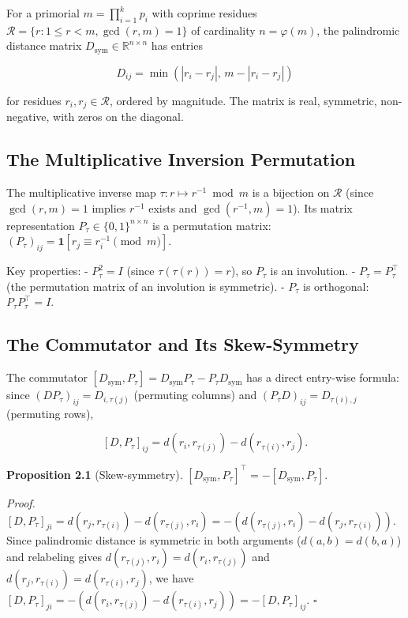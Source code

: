 \documentclass[11pt,letterpaper]{article}
\theoremstyle{definition}
\theoremstyle{remark}
\begin{document}
For a primorial $m = \prod_{i=1}^k p_i$ with coprime residues $\mathcal{R} = \{r : 1 \leq r < m, \gcd(r,m) = 1\}$ of cardinality $n = \varphi(m)$, the palindromic distance matrix $D_{\text{sym}} \in \mathbb{R}^{n \times n}$ has entries

\[D_{ij} = \min(|r_i - r_j|, \, m - |r_i - r_j|)\]

for residues $r_i, r_j \in \mathcal{R}$, ordered by magnitude. The matrix is real, symmetric, non-negative, with zeros on the diagonal.

\subsection{The Multiplicative Inversion Permutation}\label{the-multiplicative-inversion-permutation}

The multiplicative inverse map $\tau : r \mapsto r^{-1} \bmod m$ is a bijection on $\mathcal{R}$ (since $\gcd(r,m) = 1$ implies $r^{-1}$ exists and $\gcd(r^{-1},m) = 1$). Its matrix representation $P_\tau \in \{0,1\}^{n \times n}$ is a permutation matrix: $(P_\tau)_{ij} = \mathbf{1}[r_j \equiv r_i^{-1} \pmod{m}]$.

Key properties: - $P_\tau^2 = I$ (since $\tau(\tau(r)) = r$), so $P_\tau$ is an involution. - $P_\tau = P_\tau^\top$ (the permutation matrix of an involution is symmetric). - $P_\tau$ is orthogonal: $P_\tau P_\tau^\top = I$.

\subsection{The Commutator and Its Skew-Symmetry}\label{the-commutator-and-its-skew-symmetry}

The commutator $[D_{\text{sym}}, P_\tau] = D_{\text{sym}} P_\tau - P_\tau D_{\text{sym}}$ has a direct entry-wise formula: since $(DP_\tau)_{ij} = D_{i,\tau(j)}$ (permuting columns) and $(P_\tau D)_{ij} = D_{\tau(i),j}$ (permuting rows),

\[[D, P_\tau]_{ij} = d(r_i, r_{\tau(j)}) - d(r_{\tau(i)}, r_j).\]

\textbf{Proposition 2.1} (Skew-symmetry). $[D_{\text{sym}}, P_\tau]^\top = -[D_{\text{sym}}, P_\tau]$.

\emph{Proof.} $[D, P_\tau]_{ji} = d(r_j, r_{\tau(i)}) - d(r_{\tau(j)}, r_i) = -(d(r_{\tau(j)}, r_i) - d(r_j, r_{\tau(i)}))$. Since palindromic distance is symmetric in both arguments ($d(a,b) = d(b,a)$) and relabeling gives $d(r_{\tau(j)}, r_i) = d(r_i, r_{\tau(j)})$ and $d(r_j, r_{\tau(i)}) = d(r_{\tau(i)}, r_j)$, we have $[D, P_\tau]_{ji} = -(d(r_i, r_{\tau(j)}) - d(r_{\tau(i)}, r_j)) = -[D, P_\tau]_{ij}$. $\square$
\end{document}
